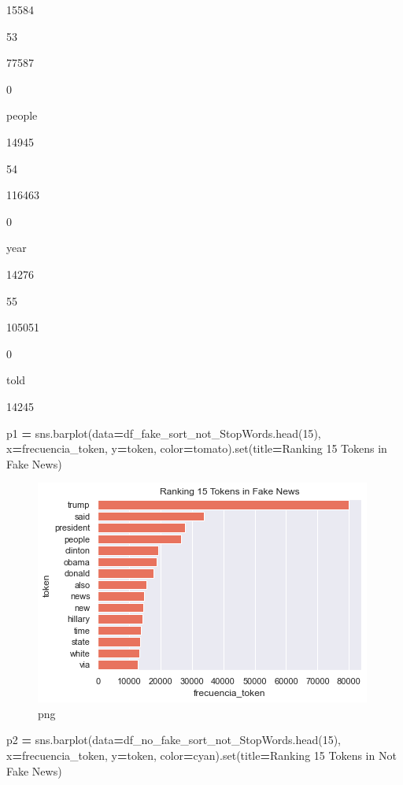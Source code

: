 \documentclass[
  11pt,
  a4paper,
]{article}
\newenvironment{Shaded}{\begin{snugshade}}{\end{snugshade}}
\newcommand{\BuiltInTok}[1]{#1}
\newcommand{\DecValTok}[1]{\textcolor[rgb]{0.00,0.00,0.81}{#1}}
\newcommand{\NormalTok}[1]{#1}
\newcommand{\OperatorTok}[1]{\textcolor[rgb]{0.81,0.36,0.00}{\textbf{#1}}}
\newcommand{\StringTok}[1]{\textcolor[rgb]{0.31,0.60,0.02}{#1}}
\begin{document}
15584

53

77587

0

people

14945

54

116463

0

year

14276

55

105051

0

told

14245

\begin{Shaded}
\begin{Highlighting}[]
\NormalTok{p1 }\OperatorTok{=}\NormalTok{ sns.barplot(data}\OperatorTok{=}\NormalTok{df\_fake\_sort\_not\_StopWords.head(}\DecValTok{15}\NormalTok{), x}\OperatorTok{=}\StringTok{\textquotesingle{}frecuencia\_token\textquotesingle{}}\NormalTok{, y}\OperatorTok{=}\StringTok{\textquotesingle{}token\textquotesingle{}}\NormalTok{, color}\OperatorTok{=}\StringTok{\textquotesingle{}tomato\textquotesingle{}}\NormalTok{).}\BuiltInTok{set}\NormalTok{(title}\OperatorTok{=}\StringTok{\textquotesingle{}Ranking 15 Tokens in Fake News\textquotesingle{}}\NormalTok{) }
\end{Highlighting}
\end{Shaded}

\begin{figure}
\centering
\includegraphics{output_63_0.png}
\caption{png}
\end{figure}

\begin{Shaded}
\begin{Highlighting}[]
\NormalTok{p2 }\OperatorTok{=}\NormalTok{ sns.barplot(data}\OperatorTok{=}\NormalTok{df\_no\_fake\_sort\_not\_StopWords.head(}\DecValTok{15}\NormalTok{), x}\OperatorTok{=}\StringTok{\textquotesingle{}frecuencia\_token\textquotesingle{}}\NormalTok{, y}\OperatorTok{=}\StringTok{\textquotesingle{}token\textquotesingle{}}\NormalTok{, color}\OperatorTok{=}\StringTok{\textquotesingle{}cyan\textquotesingle{}}\NormalTok{).}\BuiltInTok{set}\NormalTok{(title}\OperatorTok{=}\StringTok{\textquotesingle{}Ranking 15 Tokens in Not Fake News\textquotesingle{}}\NormalTok{) }
\end{Highlighting}
\end{Shaded}
\end{document}
